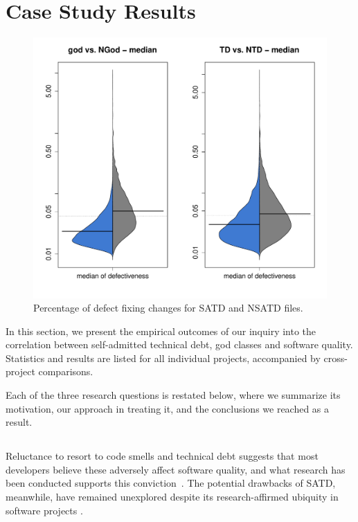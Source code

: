 \section{Case Study Results}
\label{chap4:sec:case_study_results}

\begin{figure}[tb]
	\centering
	\includegraphics[width=140mm]{figures/chapter4/rq1_defectivness_distrubution}
	\caption{Percentage of defect fixing changes for SATD and NSATD files.}
	\label{figure:ch4_number_of_fixing_changes_TD_vs_NTD}
\end{figure}

In this section, we present the empirical outcomes of our inquiry into the correlation between self-admitted technical debt, god classes and software quality. Statistics and results are listed for all individual projects, accompanied by cross-project comparisons.

Each of the three research questions is restated below, where we summarize its motivation, our approach in treating it, and the conclusions we reached as a result.

\subsection*{\chapterIVrqI}


Reluctance to resort to code smells and technical debt suggests that most developers believe these adversely affect software quality, and what research has been conducted supports this conviction~\cite{zazworka2011investigating}.  The potential drawbacks of SATD, meanwhile, have remained unexplored despite its research-affirmed ubiquity in software projects \cite{ICSM_PotdarS14}.

